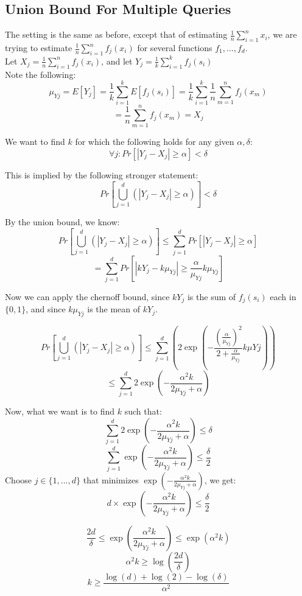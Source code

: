 \subsection{Union Bound For Multiple Queries}
The setting is the same as before, except that of estimating $\frac{1}{n}\sum^n_{i=1}x_i$, we are trying to estimate $\frac{1}{n}\sum^n_{i=1}f_j(x_i)$ for several functions $f_1, ..., f_d$. \\

\noindent Let $X_j = \frac{1}{n}\sum^{n}_{i=1}f_j(x_i)$, and let $Y_j = \frac{1}{k}\sum^{k}_{i=1}f_j(s_i)$ \\

Note the following:
$$\mu_{Yj} = E[Y_j] = \frac{1}{k}\sum^{k}_{i=1}E[f_j(s_i)] = \frac{1}{k}\sum^{k}_{i=1}\frac{1}{n}\sum^{n}_{m=1}f_j(x_m)$$
$$ = \frac{1}{n}\sum^{n}_{m=1}f_j(x_m) = X_j $$

We want to find $k$ for which the following holds for any given $\alpha, \delta$:
$$ \forall j: Pr[|Y_j - X_j| \geq \alpha ] < \delta $$

This is implied by the following stronger statement:
$$ Pr[ \bigcup_{j=1}^{d}(|Y_j - X_j| \geq \alpha ) ] < \delta $$

By the union bound, we know:
$$ Pr[ \bigcup_{j=1}^{d}(|Y_j - X_j| \geq \alpha ) ] \leq \sum_{j=1}^{d} Pr[|Y_j - X_j| \geq \alpha] $$
$$ = \sum_{j=1}^{d} Pr[|k Y_j - k \mu_{Yj}| \geq \frac{\alpha}{\mu_{Yj}} k\mu_{Yj}] $$

Now we can apply the chernoff bound, since $kY_j$ is the sum of $f_j(s_i)$ each in $\{0, 1\}$, and since $k\mu_{Yj}$ is the mean of $k Y_j$.

$$ Pr[ \bigcup_{j=1}^{d}(|Y_j - X_j| \geq \alpha ) ] \leq \sum_{j=1}^{d} (2 \exp(- \frac{(\frac{\alpha}{\mu_{Yj}})^2}{2 + \frac{\alpha}{\mu_{Yj}}} k\mu{Yj}) )$$
$$ \leq \sum_{j=1}^{d} 2 \exp(- \frac{\alpha^{2}k}{2\mu_{Yj}+\alpha})$$

Now, what we want is to find $k$ such that:
$$\sum_{j=1}^{d} 2 \exp(- \frac{\alpha^{2}k}{2\mu_{Yj}+\alpha}) \leq \delta$$
$$\sum_{j=1}^{d} \exp(- \frac{\alpha^{2}k}{2\mu_{Yj}+\alpha}) \leq \frac{\delta}{2}$$
Choose $j \in \{1, ..., d\}$ that minimizes $\exp(- \frac{\alpha^{2}k}{2\mu_{Yj}+\alpha})$, we get:
$$ d \times \exp(- \frac{\alpha^{2}k}{2\mu_{Yj}+\alpha}) \leq \frac{\delta}{2} $$

$$\frac{2d}{\delta} \leq \exp(\frac{\alpha^{2}k}{2\mu_{Yj}+\alpha}) \leq \exp(\alpha^2 k)$$
$$ \alpha^2 k \geq \log(\frac{2d}{\delta}) $$
$$ k \geq \frac{\log(d) + \log(2) - \log(\delta)}{\alpha^2}$$